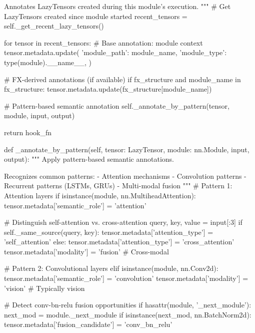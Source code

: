             Annotates LazyTensors created during this module's execution.
            """
            # Get LazyTensors created since module started
            recent_tensors = self._get_recent_lazy_tensors()
            
            for tensor in recent_tensors:
                # Base annotation: module context
                tensor.metadata.update({
                    'module_path': module_name,
                    'module_type': type(module).__name__,
                })
                
                # FX-derived annotations (if available)
                if fx_structure and module_name in fx_structure:
                    tensor.metadata.update(fx_structure[module_name])
                
                # Pattern-based semantic annotation
                self._annotate_by_pattern(tensor, module, input, output)
        
        return hook_fn
    
    def _annotate_by_pattern(self, tensor: LazyTensor, module: nn.Module,
                             input, output):
        """
        Apply pattern-based semantic annotations.
        
        Recognizes common patterns:
        - Attention mechanisms
        - Convolution patterns
        - Recurrent patterns (LSTMs, GRUs)
        - Multi-modal fusion
        """
        # Pattern 1: Attention layers
        if isinstance(module, nn.MultiheadAttention):
            tensor.metadata['semantic_role'] = 'attention'
            
            # Distinguish self-attention vs. cross-attention
            query, key, value = input[:3]
            if self._same_source(query, key):
                tensor.metadata['attention_type'] = 'self_attention'
            else:
                tensor.metadata['attention_type'] = 'cross_attention'
                tensor.metadata['modality'] = 'fusion'  # Cross-modal
        
        # Pattern 2: Convolutional layers
        elif isinstance(module, nn.Conv2d):
            tensor.metadata['semantic_role'] = 'convolution'
            tensor.metadata['modality'] = 'vision'  # Typically vision
            
            # Detect conv-bn-relu fusion opportunities
            if hasattr(module, '_next_module'):
                next_mod = module._next_module
                if isinstance(next_mod, nn.BatchNorm2d):
                    tensor.metadata['fusion_candidate'] = 'conv_bn_relu'
        
